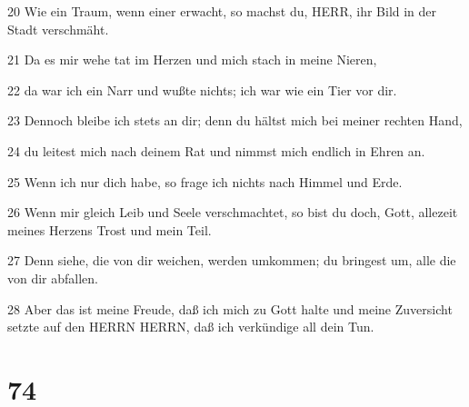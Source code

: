 \par 20 Wie ein Traum, wenn einer erwacht, so machst du, HERR, ihr Bild in der Stadt verschmäht.
\par 21 Da es mir wehe tat im Herzen und mich stach in meine Nieren,
\par 22 da war ich ein Narr und wußte nichts; ich war wie ein Tier vor dir.
\par 23 Dennoch bleibe ich stets an dir; denn du hältst mich bei meiner rechten Hand,
\par 24 du leitest mich nach deinem Rat und nimmst mich endlich in Ehren an.
\par 25 Wenn ich nur dich habe, so frage ich nichts nach Himmel und Erde.
\par 26 Wenn mir gleich Leib und Seele verschmachtet, so bist du doch, Gott, allezeit meines Herzens Trost und mein Teil.
\par 27 Denn siehe, die von dir weichen, werden umkommen; du bringest um, alle die von dir abfallen.
\par 28 Aber das ist meine Freude, daß ich mich zu Gott halte und meine Zuversicht setzte auf den HERRN HERRN, daß ich verkündige all dein Tun.

\chapter{74}


